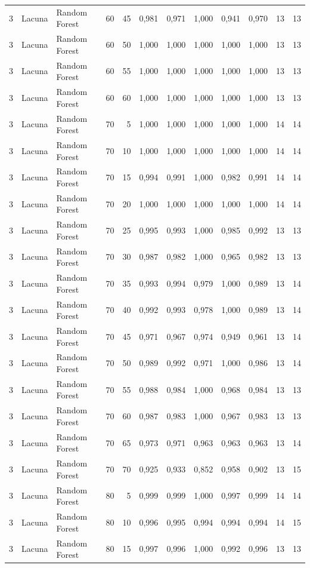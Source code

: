 \begin{longtable}{@{}rllrrrrrrrrr@{}}
3 & Lacuna & Random Forest & 60 & 45 & 0,981 & 0,971 & 1,000 & 0,941 & 0,970 & 13 & 13 \\
3 & Lacuna & Random Forest & 60 & 50 & 1,000 & 1,000 & 1,000 & 1,000 & 1,000 & 13 & 13 \\
3 & Lacuna & Random Forest & 60 & 55 & 1,000 & 1,000 & 1,000 & 1,000 & 1,000 & 13 & 13 \\
3 & Lacuna & Random Forest & 60 & 60 & 1,000 & 1,000 & 1,000 & 1,000 & 1,000 & 13 & 13 \\
3 & Lacuna & Random Forest & 70 & 5 & 1,000 & 1,000 & 1,000 & 1,000 & 1,000 & 14 & 14 \\
3 & Lacuna & Random Forest & 70 & 10 & 1,000 & 1,000 & 1,000 & 1,000 & 1,000 & 14 & 14 \\
3 & Lacuna & Random Forest & 70 & 15 & 0,994 & 0,991 & 1,000 & 0,982 & 0,991 & 14 & 14 \\
3 & Lacuna & Random Forest & 70 & 20 & 1,000 & 1,000 & 1,000 & 1,000 & 1,000 & 14 & 14 \\
3 & Lacuna & Random Forest & 70 & 25 & 0,995 & 0,993 & 1,000 & 0,985 & 0,992 & 13 & 13 \\
3 & Lacuna & Random Forest & 70 & 30 & 0,987 & 0,982 & 1,000 & 0,965 & 0,982 & 13 & 13 \\
3 & Lacuna & Random Forest & 70 & 35 & 0,993 & 0,994 & 0,979 & 1,000 & 0,989 & 13 & 14 \\
3 & Lacuna & Random Forest & 70 & 40 & 0,992 & 0,993 & 0,978 & 1,000 & 0,989 & 13 & 14 \\
3 & Lacuna & Random Forest & 70 & 45 & 0,971 & 0,967 & 0,974 & 0,949 & 0,961 & 13 & 14 \\
3 & Lacuna & Random Forest & 70 & 50 & 0,989 & 0,992 & 0,971 & 1,000 & 0,986 & 13 & 14 \\
3 & Lacuna & Random Forest & 70 & 55 & 0,988 & 0,984 & 1,000 & 0,968 & 0,984 & 13 & 13 \\
3 & Lacuna & Random Forest & 70 & 60 & 0,987 & 0,983 & 1,000 & 0,967 & 0,983 & 13 & 13 \\
3 & Lacuna & Random Forest & 70 & 65 & 0,973 & 0,971 & 0,963 & 0,963 & 0,963 & 13 & 14 \\
3 & Lacuna & Random Forest & 70 & 70 & 0,925 & 0,933 & 0,852 & 0,958 & 0,902 & 13 & 15 \\
3 & Lacuna & Random Forest & 80 & 5 & 0,999 & 0,999 & 1,000 & 0,997 & 0,999 & 14 & 14 \\
3 & Lacuna & Random Forest & 80 & 10 & 0,996 & 0,995 & 0,994 & 0,994 & 0,994 & 14 & 15 \\
3 & Lacuna & Random Forest & 80 & 15 & 0,997 & 0,996 & 1,000 & 0,992 & 0,996 & 13 & 13 \\

\end{longtable}
